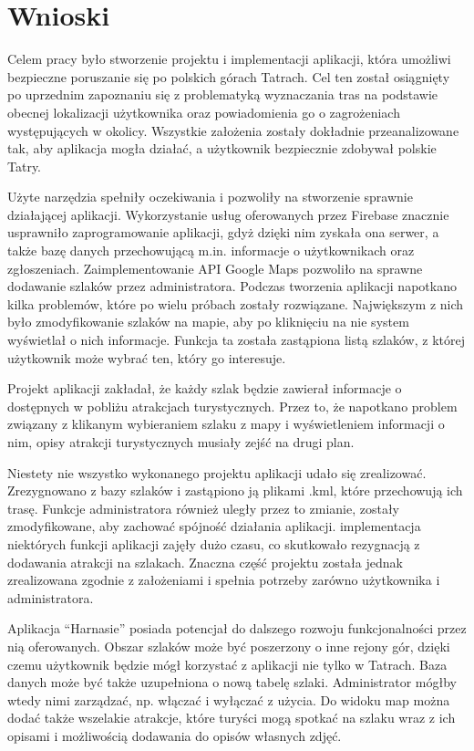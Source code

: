 \section{Wnioski} \label{wnioski}
Celem pracy było stworzenie projektu i implementacji aplikacji, która umożliwi bezpieczne poruszanie się po polskich górach Tatrach. Cel ten został osiągnięty po uprzednim zapoznaniu się z problematyką wyznaczania tras na podstawie obecnej lokalizacji użytkownika oraz powiadomienia go o zagrożeniach występujących w okolicy. Wszystkie założenia zostały dokładnie przeanalizowane tak, aby aplikacja mogła działać, a użytkownik bezpiecznie zdobywał polskie Tatry.

Użyte narzędzia spełniły oczekiwania i pozwoliły na stworzenie sprawnie działającej aplikacji. Wykorzystanie usług oferowanych przez Firebase znacznie usprawniło zaprogramowanie aplikacji, gdyż dzięki nim zyskała ona serwer, a także bazę danych przechowującą m.in. informacje o użytkownikach oraz zgłoszeniach. Zaimplementowanie API Google Maps pozwoliło na sprawne dodawanie szlaków przez administratora.
Podczas tworzenia aplikacji napotkano kilka problemów, które po wielu próbach zostały rozwiązane. Największym z nich było zmodyfikowanie szlaków na mapie, aby po kliknięciu na nie system wyświetlał o nich informacje. Funkcja ta została zastąpiona listą szlaków, z której użytkownik może wybrać ten, który go interesuje.

Projekt aplikacji zakładał, że każdy szlak będzie zawierał informacje o dostępnych w pobliżu atrakcjach turystycznych. Przez to, że napotkano problem związany z klikanym wybieraniem szlaku z mapy i wyświetleniem informacji o nim, opisy atrakcji turystycznych musiały zejść na drugi plan.

Niestety nie wszystko wykonanego projektu aplikacji udało się zrealizować. Zrezygnowano z bazy szlaków i zastąpiono ją plikami .kml, które przechowują ich trasę. Funkcje administratora również uległy przez to zmianie, zostały zmodyfikowane, aby zachować spójność działania aplikacji. implementacja niektórych funkcji aplikacji zajęły dużo czasu, co skutkowało rezygnacją z dodawania atrakcji na szlakach. Znaczna część projektu została jednak zrealizowana zgodnie z założeniami i spełnia potrzeby zarówno użytkownika i administratora.

Aplikacja “Harnasie” posiada potencjał do dalszego rozwoju funkcjonalności przez nią oferowanych. Obszar szlaków może być poszerzony o inne rejony gór, dzięki czemu użytkownik będzie mógł korzystać z aplikacji nie tylko w Tatrach. Baza danych może być także uzupełniona o nową tabelę szlaki. Administrator mógłby wtedy nimi zarządzać, np. włączać i wyłączać z użycia. Do widoku map można dodać także wszelakie atrakcje, które turyści mogą spotkać na szlaku wraz z ich opisami i możliwością dodawania do opisów własnych zdjęć.

